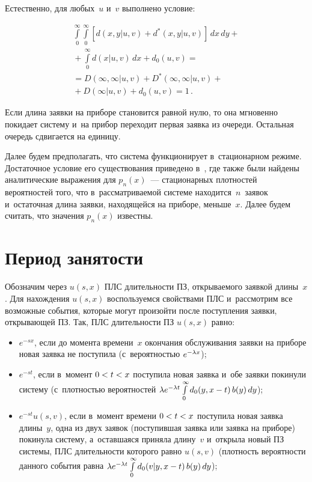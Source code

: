 \begin{multicols}{2}
Естественно, для любых~$u$ и~$v$ выполнено условие:

\vspace*{-2pt}

\noindent
\begin{multline*}
\int\limits_0^\infty \int\limits_0^\infty
\left[d(x,y|u,v) + d^*(x,y|u,v)\right] \,dx\,dy
+{}\\[-6pt]
{}+ \int\limits_0^\infty d(x|u,v) \,dx +
d_0(u,v) ={}\\
{}=
D(\infty,\infty|u,v)+D^*(\infty,\infty|u,v)
+{}\\
{}+ D(\infty|u,v) + d_0(u,v) = 1\,.
\end{multline*}



Если длина заявки на приборе становится
равной нулю, то она мгновенно покидает систему и~на прибор переходит первая
заявка из очереди. Остальная очередь сдвигается на единицу.


Далее будем предполагать, что система функционирует в~стационарном режиме.
Достаточное условие его существования приведено в~\cite{lataavrv}, где также были найдены аналитические выражения для $p_n(x)$~--- стационарных плотностей вероятностей того, что в~рассматриваемой системе находится~$n$~заявок и~остаточная длина заявки, находящейся на приборе, меньше~$x$.
Далее будем считать, что значения $p_n(x)$ известны.

\section{Период занятости}

Обозначим через $u(s,x)$ ПЛС длительности ПЗ,
открываемого заявкой длины~$x$.
Для нахождения $u(s,x)$ воспользуемся свойствами ПЛС и~рас\-смот\-рим все возможные
события, которые могут произойти после поступления заявки, открывающей ПЗ.
Так, ПЛС длительности ПЗ  $u(s,x)$ равно:
\begin{itemize}
\item  $e^{-s x}$,
если до момента времени~$x$ окончания обслуживания заявки на приборе
новая заявка не поступила (с~вероятностью $e^{-\lambda x}$);

\item $e^{-s t}$, если в~момент $0\hm<t\hm<x$
поступила новая заявка и~обе заявки покинули
систему (с~плот\-ностью вероятностей
$\la e^{-\la t} \int\limits_0^\infty d_0(y,x\hm-t)\,b(y)\,dy$);

\item $e^{-s t} u(s,v)$, если в~момент времени
$0\hm<t\hm<x$ поступила новая заявка длины~$y$, одна из двух
заявок (поступившая заявка или
заявка на приборе) покинула систему, а~оставшаяся приняла длину~$v$ и~открыла
новый ПЗ системы, ПЛС длительности которого равно $u(s,v)$
(плот\-ность вероятности данного события равна
$ \la e^{-\la t} \int\limits_0^\infty d_0(v|y,x\hm-t)\, b(y)\, dy$);


\end{itemize}
\end{multicols}

